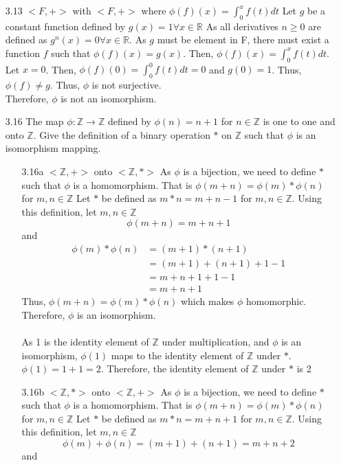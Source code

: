 \documentclass[12pt]{article}
\newcommand{\Z}{\mathds{Z}}
\newcommand{\R}{\mathbb{R}}
\begin{document}
\begin{enumerate}
\begin{enumerate}
			\item[3.13] $<F,+>$ with $<F,+>$ where $\phi(f)(x) = \int_0^xf(t)dt $ 
				Let $ g $ be a constant function defined by $ g(x)=1 \forall x \in \R $ As all derivatives $n\geq 0 $ are defined as $ g^{n}(x)=0 \forall x\in\R $. As $ g $ must be element in F, there must exist a function $ f $ such that $ \phi(f)(x) = g(x) $. Then, $ \phi(f)(x)=\int_{0}^{x} f(t)dt$. Let $ x=0 $. Then, $\phi(f)(0)=\int_{0}^{0} f(t)dt=0$ and $ g(0)=1 $. Thus, $\phi(f)\not = g$. Thus, $ \phi $ is not surjective.\\
				Therefore, $ \phi $ is not an isomorphism.
			\item[3.16] The map $\phi: \Z \rightarrow \Z$ defined by $\phi (n) = n+1$ for $n \in \Z$ is one to one and onto $\Z$. Give the definition of a binary operation $*$ on $\Z$ such that $\phi$ is an isomorphism mapping.
			\begin{enumerate}
				\item[3.16a]
				$<\Z,+>$ onto $<\Z,*>$
				As $ \phi $ is a bijection, we need to define $ * $ such that $ \phi $ is a homomorphism. That is $ \phi(m+n)=\phi(m)*\phi(n) $ for $ m,n \in\Z $
				Let $ * $ be defined as $ m*n = m+n-1$ for $ m,n\in\Z $. Using this definition, let $ m,n\in\Z $
					\[\phi(m + n)=m+n+1\] and
					\begin{align*}
						\phi(m)*\phi(n) &= (m+1)*(n+1)\\
										&= (m+1) + (n+1) + 1 - 1\\
										&= m + n + 1 + 1 -1\\
										&= m+n+1
					\end{align*}
					Thus, $ \phi(m+n)=\phi(m)*\phi(n) $ which makes $ \phi $ homomorphic.\\
					Therefore, $ \phi $ is an isomorphism.\\
					\\
					As 1 is the identity element of $\Z$  under multiplication, and $ \phi $ is an isomorphism, $ \phi(1) $ maps to the identity element of $ \Z $ under $ * $. $ \phi(1) = 1+1=2 $. Therefore, the identity element of $ \Z $ under $ * $ is 2
				\item[3.16b]
				$<\Z,*>$ onto $<\Z,+>$
					As $ \phi $ is a bijection, we need to define $ * $ such that $ \phi $ is a homomorphism. That is $ \phi(m+n)=\phi(m)*\phi(n) $ for $ m,n \in\Z $
					Let $ * $ be defined as $ m*n = m+n+1$ for $ m,n\in\Z $. Using this definition, let $ m,n\in\Z $
					\[\phi(m)+\phi(n)=(m+1)+(n+1)=m+n+2\] and
					\begin{align*}

\end{align*}
\end{enumerate}
\end{enumerate}
\end{enumerate}
\end{document}
